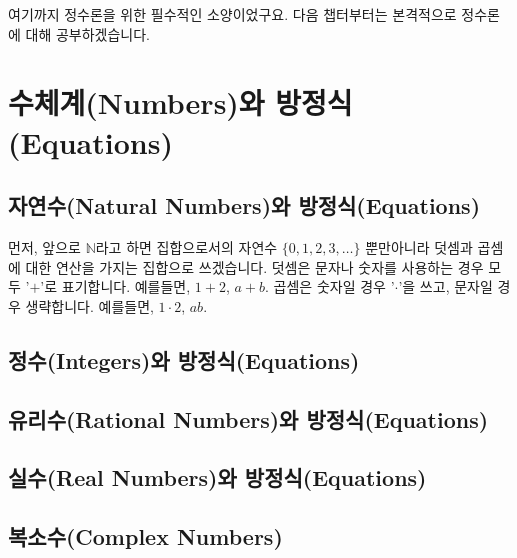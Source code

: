 \documentclass[a4paper, 11pt]{report}
\renewcommand{\<}{\langle}
\renewcommand{\>}{\rangle}
\begin{document}
여기까지 정수론을 위한 필수적인 소양이었구요. 다음 챕터부터는 본격적으로 정수론에 대해 공부하겠습니다.


\chapter{수체계(Numbers)와 방정식(Equations)}

\section{자연수(Natural Numbers)와 방정식(Equations)}

먼저, 앞으로 $\mathbb{N}$라고 하면 집합으로서의 자연수 $\{0, 1, 2, 3, \ldots\}$ 뿐만아니라 덧셈과 곱셈에 대한 연산을 가지는
집합으로 쓰겠습니다. 덧셈은 문자나 숫자를 사용하는 경우 모두 '$+$'로 표기합니다. 예를들면, $1 + 2$, $a + b$.
곱셈은 숫자일 경우 '$\cdot$'을 쓰고, 문자일 경우 생략합니다. 예를들면, $1\cdot2$, $ab$.  

\section{정수(Integers)와 방정식(Equations)}

\section{유리수(Rational Numbers)와 방정식(Equations)}

\section{실수(Real Numbers)와 방정식(Equations)}

\section{복소수(Complex Numbers)} 



\end{document}
